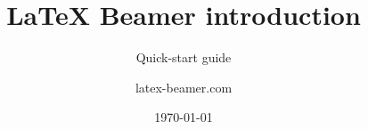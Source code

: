 \documentclass{beamer}
\title{\LaTeX{} Beamer introduction}
\subtitle{Quick-start guide}
\author{latex-beamer.com}
\institute{Online Education}
\date{\today}
\begin{document}
\begin{frame}
\titlepage
\end{frame}
\end{document}
